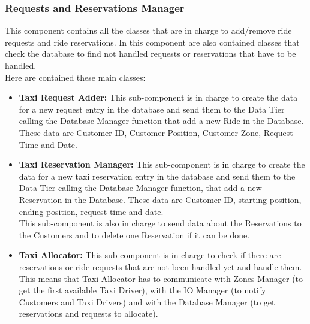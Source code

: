 \documentclass[../../../../../../../dd.tex]{subfiles}
\begin{document}
	\subsubsection{Requests and Reservations Manager}
		This component contains all the classes that are in charge to add/remove ride requests and ride reservations. In this component are also contained classes that check the database to find not handled requests or reservations that have to be handled.
		\\
		Here are contained these main classes:
		\\
		\begin{itemize}
			\item \textbf{Taxi Request Adder:} This sub-component is in charge to create the data for a new request entry in the database and send them to the Data Tier calling the Database Manager function that add a new Ride in the Database.
			These data are Customer ID, Customer Position, Customer Zone, Request Time and Date.

			\item \textbf{Taxi Reservation Manager:} This sub-component is in charge to create the data for a new taxi reservation entry in the database and send them to the Data Tier calling the Database Manager function, that add a new Reservation in the Database.
			These data are Customer ID, starting position, ending position, request time and date.
			\\This sub-component is also in charge to send data about the Reservations to the Customers and to delete one Reservation if it can be done.

			\item \textbf{Taxi Allocator:} This sub-component is in charge to check if there are reservations or ride requests that are not been handled yet and handle them.
			This means that Taxi Allocator has to communicate with Zones Manager (to get the first available Taxi Driver), with the IO Manager (to notify Customers and Taxi Drivers) and with the Database Manager (to get reservations and requests to allocate).

		\end{itemize}
\end{document}
